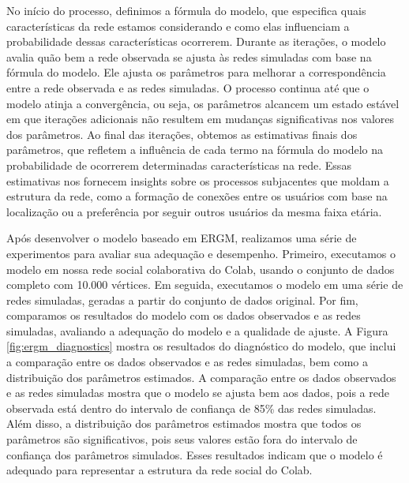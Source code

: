 No início do processo, definimos a fórmula do modelo, que especifica quais características da rede estamos considerando e como elas influenciam a probabilidade dessas características ocorrerem. Durante as iterações, o modelo avalia quão bem a rede observada se ajusta às redes simuladas com base na fórmula do modelo. Ele ajusta os parâmetros para melhorar a correspondência entre a rede observada e as redes simuladas. O processo continua até que o modelo atinja a convergência, ou seja, os parâmetros alcancem um estado estável em que iterações adicionais não resultem em mudanças significativas nos valores dos parâmetros. Ao final das iterações, obtemos as estimativas finais dos parâmetros, que refletem a influência de cada termo na fórmula do modelo na probabilidade de ocorrerem determinadas características na rede. Essas estimativas nos fornecem insights sobre os processos subjacentes que moldam a estrutura da rede, como a formação de conexões entre os usuários com base na localização ou a preferência por seguir outros usuários da mesma faixa etária.

Após desenvolver o modelo baseado em ERGM, realizamos uma série de experimentos para avaliar sua adequação e desempenho. Primeiro, executamos o modelo em nossa rede social colaborativa do Colab, usando o conjunto de dados completo com 10.000 vértices. Em seguida, executamos o modelo em uma série de redes simuladas, geradas a partir do conjunto de dados original. Por fim, comparamos os resultados do modelo com os dados observados e as redes simuladas, avaliando a adequação do modelo e a qualidade de ajuste. A Figura \ref{fig:ergm_diagnostics} mostra os resultados do diagnóstico do modelo, que inclui a comparação entre os dados observados e as redes simuladas, bem como a distribuição dos parâmetros estimados. A comparação entre os dados observados e as redes simuladas mostra que o modelo se ajusta bem aos dados, pois a rede observada está dentro do intervalo de confiança de 85\% das redes simuladas. Além disso, a distribuição dos parâmetros estimados mostra que todos os parâmetros são significativos, pois seus valores estão fora do intervalo de confiança dos parâmetros simulados. Esses resultados indicam que o modelo é adequado para representar a estrutura da rede social do Colab.

